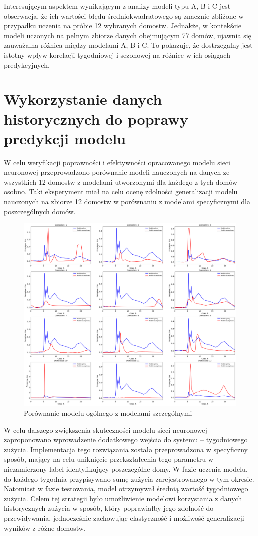 \documentclass[a4paper,twoside,12pt]{book}
\begin{document}
Interesującym aspektem wynikającym z analizy modeli typu A, B i C jest obserwacja, że ich wartości błędu średniokwadratowego są znacznie zbliżone w przypadku uczenia na próbie 12 wybranych domostw. Jednakże, w kontekście modeli uczonych na pełnym zbiorze danych obejmującym 77 domów, ujawnia się zauważalna różnica między modelami A, B i C. To pokazuje, że dostrzegalny jest istotny wpływ korelacji tygodniowej i sezonowej na różnice w ich osiągach predykcyjnych.
\newpage
\section{Wykorzystanie danych historycznych do poprawy predykcji modelu}
W celu weryfikacji poprawności i efektywności opracowanego modelu sieci neuronowej przeprowadzono porównanie modeli nauczonych na danych ze wszystkich 12 domostw z modelami utworzonymi dla każdego z tych domów osobno. Taki eksperyment miał na celu ocenę zdolności generalizacji modelu nauczonych na zbiorze 12 domostw w porównaniu z modelami specyficznymi dla poszczególnych domów.

\begin{figure}[!h]
  \centering
  \includegraphics[width=1\textwidth]{img/szczegółowy_ogolny_porówniaie.png}
  \caption{Porównanie modelu ogólnego z modelami szczególnymi}
  \label{fig:etykieta-rysunku}
\end{figure}


W celu dalszego zwiększenia skuteczności modelu sieci neuronowej zaproponowano wprowadzenie dodatkowego wejścia do systemu – tygodniowego zużycia. Implementacja tego rozwiązania została przeprowadzona w specyficzny sposób, mający na celu uniknięcie przekształcenia tego parametru w niezamierzony label identyfikujący poszczególne domy. W fazie uczenia modelu, do każdego tygodnia przypisywano sumę zużycia zarejestrowanego w tym okresie. Natomiast w fazie testowania, model otrzymywał średnią wartość tygodniowego zużycia. Celem tej strategii było umożliwienie modelowi korzystania z danych historycznych zużycia w sposób, który poprawiałby jego zdolność do przewidywania, jednocześnie zachowując elastyczność i możliwość generalizacji wyników z różne domostw.
\end{document}
